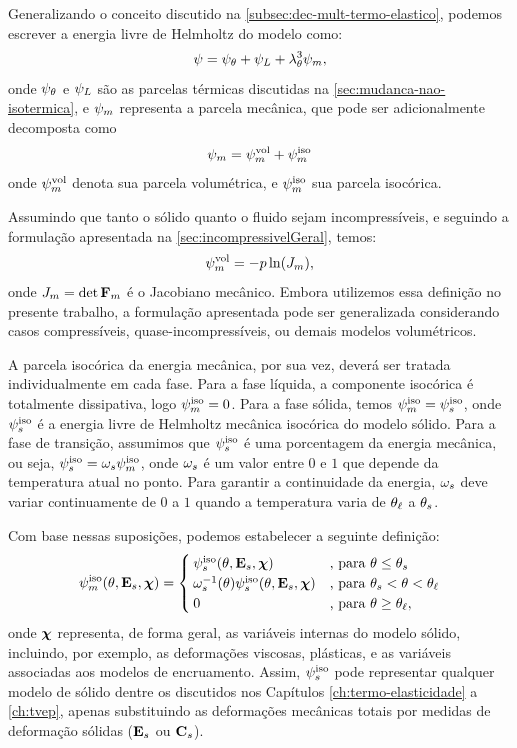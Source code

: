 \documentclass[Tese.tex]{subfiles}
\begin{document}
Generalizando o conceito discutido na \cref{subsec:dec-mult-termo-elastico}, podemos escrever a energia livre de Helmholtz do modelo como:
\begin{equation}
\psi = \psi_{\theta} + \psi_L + \lambda_{\theta}^3\psi_m,
\end{equation}
onde $\psi_{\theta}$ e $\psi_L$ são as parcelas térmicas discutidas na \cref{sec:mudanca-nao-isotermica}, e $\psi_m$ representa a parcela mecânica, que pode ser adicionalmente decomposta como
\begin{equation}
\psi_m = \psi_m^\text{vol} + \psi_m^\text{iso}
\end{equation}
onde $\psi_m^\text{vol}$ denota sua parcela volumétrica, e $\psi_m^\text{iso}$ sua parcela isocórica. 

Assumindo que tanto o sólido quanto o fluido sejam incompressíveis, e seguindo a formulação apresentada na \cref{sec:incompressivelGeral}, temos:
\begin{equation}\label{eq:incompressivel}
\psi_m^\text{vol} = -p \ln(J_m),
\end{equation}
onde $J_m = \det\mathbf{F}_m$ é o Jacobiano mecânico. Embora utilizemos essa definição no presente trabalho, a formulação apresentada pode ser generalizada considerando casos compressíveis, quase-incompressíveis, ou demais modelos volumétricos.

A parcela isocórica da energia mecânica, por sua vez, deverá ser tratada individualmente em cada fase. Para a fase líquida, a componente isocórica é totalmente dissipativa, logo $\psi_m^\text{iso} = 0$. Para a fase sólida, temos $\psi_m^\text{iso} = \psi_s^\text{iso}$, onde $\psi_s^\text{iso}$ é a energia livre de Helmholtz mecânica isocórica do modelo sólido. Para a fase de transição, assumimos que $\psi_s^\text{iso}$ é uma porcentagem da energia mecânica, ou seja, $\psi_s^\text{iso} = \omega_s\psi_m^\text{iso}$, onde $\omega_s$ é um valor entre $0$ e $1$ que depende da temperatura atual no ponto. Para garantir a continuidade da energia, $\omega_s$ deve variar continuamente de $0$ a $1$ quando a temperatura varia de $\theta_\ell$ a $\theta_s$. 

Com base nessas suposições, podemos estabelecer a seguinte definição:
\begin{equation}\label{eq:helmholtzmiso}
\psi_m^\text{iso}(\theta,\mathbf{E}_s,\boldsymbol{\chi}) = 
\begin{cases}
\psi_s^\text{iso}(\theta,\mathbf{E}_s,\boldsymbol{\chi}) 			&\text{, para }\theta \leq \theta_s\\
\omega_s^{-1}(\theta)\psi_s^\text{iso}(\theta,\mathbf{E}_s,\boldsymbol{\chi}) &\text{, para }\theta_s < \theta < \theta_\ell \\
0			&\text{, para }\theta \geq \theta_\ell,
\end{cases}
\end{equation}
onde $\boldsymbol{\chi}$ representa, de forma geral, as variáveis internas do modelo sólido, incluindo, por exemplo, as deformações viscosas, plásticas, e as variáveis associadas aos modelos de encruamento. Assim, $\psi_s^\text{iso}$ pode representar qualquer modelo de sólido dentre os discutidos nos Capítulos \ref{ch:termo-elasticidade} a \ref{ch:tvep}, apenas substituindo as deformações mecânicas totais por medidas de deformação sólidas ($\mathbf{E}_s$ ou $\mathbf{C}_s$).
\end{document}
